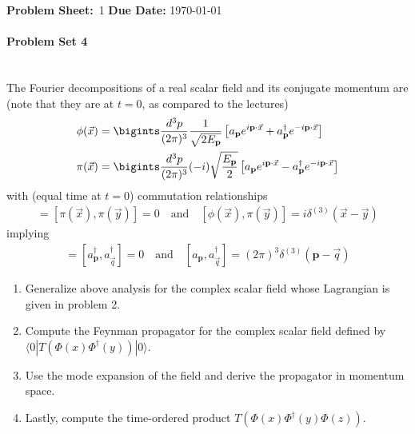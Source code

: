 {\large\textbf{Problem Sheet:}\ \textsc{1} \hspace{\hfill} \large\textbf{Due Date:} \today\\
	\hline\hline
\paragraph*{Problem Set 4} %
\\
The Fourier decompositions of a real scalar field and its conjugate momentum are (note that they are at $t = 0$, as compared to the lectures)
    \begin{align*}
        \phi(\vec{x}) &= \bigints \frac{d^3p}{(2\pi)^3} \frac{1}{\sqrt{2E_{\mathbf{p}}}} \left[a_{\mathbf{p}} e^{i\mathbf{p} \cdot \vec{x}} + a^\dagger_{\mathbf{p}} e^{-i\mathbf{p} \cdot \vec{x}} \right]\\
        \pi(\vec{x}) &= \bigints \frac{d^3p}{(2\pi)^3} (-i)\sqrt{\frac{E_{\mathbf{p}}}{2}} \left[a_{\mathbf{p}} e^{i\mathbf{p} \cdot \vec{x}} - a^\dagger_{\mathbf{p}} e^{-i\mathbf{p} \cdot \vec{x}} \right]
    \end{align*}
    with (equal time at $t = 0$) commutation relationships
    \begin{align*}
        [\phi(\vec{x}), \phi(\vec{y})] = [\pi(\vec{x}), \pi(\vec{y})] = 0 \quad \text{and} \quad [\phi(\vec{x}), \pi(\vec{y})] = i\delta^{(3)}(\vec{x} - \vec{y})
    \end{align*}
    implying
    \begin{align*}
        [a_{\mathbf{p}}, a_{\vec{q}}] = [a^\dagger_{\mathbf{p}}, a^\dagger_{\vec{q}}] = 0 \quad \text{and} \quad [a_{\mathbf{p}}, a^\dagger_{\vec{q}}] = (2\pi)^3 \delta^{(3)}(\mathbf{p} - \vec{q})
    \end{align*}
    \begin{enumerate}
        \item Generalize above analysis for the complex scalar field whose Lagrangian is given in problem 2.
        \item Compute the Feynman propagator for the complex scalar field defined by $\langle 0|T(\Phi(x) \Phi^\dagger(y))|0 \rangle$.
        \item Use the mode expansion of the field and derive the propagator in momentum space.
        \item Lastly, compute the time-ordered product $T(\Phi(x) \Phi^\dagger(y) \Phi(z))$.
    \end{enumerate}
\bigskip\bigskip\hline\hline\bigskip
}
